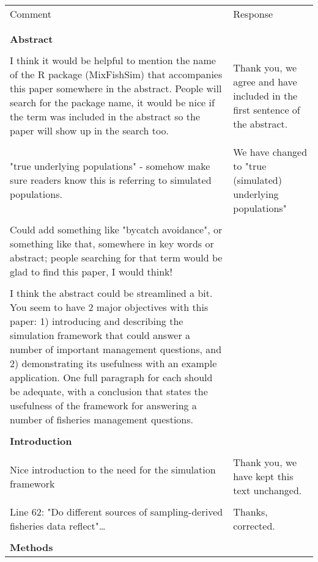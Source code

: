 \documentclass{article}
\begin{document}
\begin{landscape}
\large
	\begin{center}
	\begin{longtable}{p{12cm} | p{12cm}}
		\toprule
		Comment & Response \\
		\\
		\hline
		\\
		\textbf{Abstract} & \\
\\
I think it would be helpful to mention the name of the R package (MixFishSim)
that accompanies this paper somewhere in the abstract. People will search for
the package name, it would be nice if the term was included in the abstract so
the paper will show up in the search too. & Thank you, we agree and have
included in the first sentence of the abstract. \\
\\
"true underlying populations" - somehow make sure readers know this is
referring to simulated populations. & We have changed to "true (simulated)
underlying populations" \\
\\
Could add something like "bycatch avoidance", or something like that, somewhere
in key words or abstract; people searching for that term would be glad to find
this paper, I would think! & \\
\\
I think the abstract could be streamlined a bit. You seem to have 2 major
objectives with this paper: 1) introducing and describing the simulation
framework that could answer a number of important management questions, and 2)
demonstrating its usefulness with an example application. One full paragraph
for each should be adequate, with a conclusion that states the usefulness of
the framework for answering a number of fisheries management questions.  & \\
\\
		\hline
		\textbf{Introduction} &  \\
\\
Nice introduction to the need for the simulation framework & Thank you, we have
kept this text unchanged. \\
\\
Line 62: "Do different sources of sampling-derived fisheries data reflect"… &
Thanks, corrected. \\
\\
		\hline
		\textbf{Methods} &  \\

\end{longtable}
\end{center}
\end{landscape}
\end{document}
